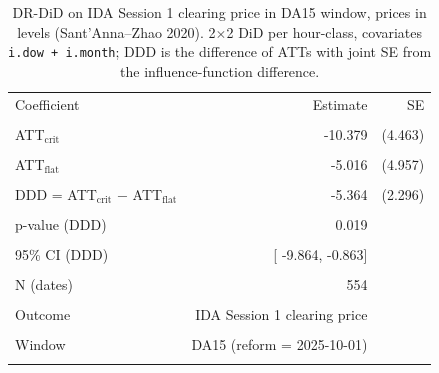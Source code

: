 \begin{table}[H]\centering\small
\caption{DR-DiD on IDA Session 1 clearing price in DA15 window, prices in levels (Sant'Anna--Zhao 2020). 2$\times$2 DiD per hour-class, covariates \texttt{i.dow + i.month}; DDD is the difference of ATTs with joint SE from the influence-function difference.}\label{tab:reform_csdid_da15_ida}
\begin{tabular}{lrr}
\toprule
Coefficient & Estimate & SE \\\\
\midrule
ATT$_{\text{crit}}$ & -10.379 & (4.463) \\\\
ATT$_{\text{flat}}$ &  -5.016 & (4.957) \\\\
DDD = ATT$_{\text{crit}}$ $-$ ATT$_{\text{flat}}$ &  -5.364 & (2.296) \\\\
\midrule
p-value (DDD)        & 0.019 & \\\\
95\% CI (DDD)        & [ -9.864,  -0.863] & \\\\
N (dates)            &   554 & \\\\
Outcome              & IDA Session 1 clearing price & \\\\
Window               & DA15 (reform = 2025-10-01) & \\\\
\bottomrule
\end{tabular}
\end{table}

